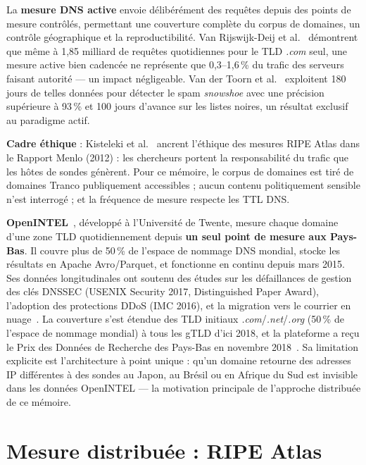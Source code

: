 La \textbf{mesure DNS active} envoie délibérément des requêtes depuis des points de mesure contrôlés, permettant une couverture complète du corpus de domaines, un contrôle géographique et la reproductibilité. Van Rijswijk-Deij et al.~\cite{vanRijswijk2016} démontrent que même à 1,85 milliard de requêtes quotidiennes pour le TLD \textit{.com} seul, une mesure active bien cadencée ne représente que 0,3--1,6\,\% du trafic des serveurs faisant autorité --- un impact négligeable. Van der Toorn et al.~\cite{vanderToorn2018} exploitent 180 jours de telles données pour détecter le spam \textit{snowshoe} avec une précision supérieure à 93\,\% et 100 jours d'avance sur les listes noires, un résultat exclusif au paradigme actif.

\textbf{Cadre éthique} : Kisteleki et al.~\cite{Kisteleki2016} ancrent l'éthique des mesures RIPE Atlas dans le Rapport Menlo (2012) : les chercheurs portent la responsabilité du trafic que les hôtes de sondes génèrent. Pour ce mémoire, le corpus de domaines est tiré de domaines Tranco publiquement accessibles ; aucun contenu politiquement sensible n'est interrogé ; et la fréquence de mesure respecte les TTL DNS.

\textbf{OpenINTEL}~\cite{vanRijswijk2016}, développé à l'Université de Twente, mesure chaque domaine d'une zone TLD quotidiennement depuis \textbf{un seul point de mesure aux Pays-Bas}. Il couvre plus de 50\,\% de l'espace de nommage DNS mondial, stocke les résultats en Apache Avro/Parquet, et fonctionne en continu depuis mars 2015. Ses données longitudinales ont soutenu des études sur les défaillances de gestion des clés DNSSEC (USENIX Security 2017, Distinguished Paper Award), l'adoption des protections DDoS (IMC 2016), et la migration vers le courrier en nuage~\cite{vanRijswijk2018blog}. La couverture s'est étendue des TLD initiaux \textit{.com}/\textit{.net}/\textit{.org} (50\,\% de l'espace de nommage mondial) à tous les gTLD d'ici 2018, et la plateforme a reçu le Prix des Données de Recherche des Pays-Bas en novembre 2018~\cite{vanRijswijk2018blog}. Sa limitation explicite est l'architecture à point unique : qu'un domaine retourne des adresses IP différentes à des sondes au Japon, au Brésil ou en Afrique du Sud est invisible dans les données OpenINTEL --- la motivation principale de l'approche distribuée de ce mémoire.

\section{Mesure distribuée : RIPE Atlas}
\label{sec:2.3}

